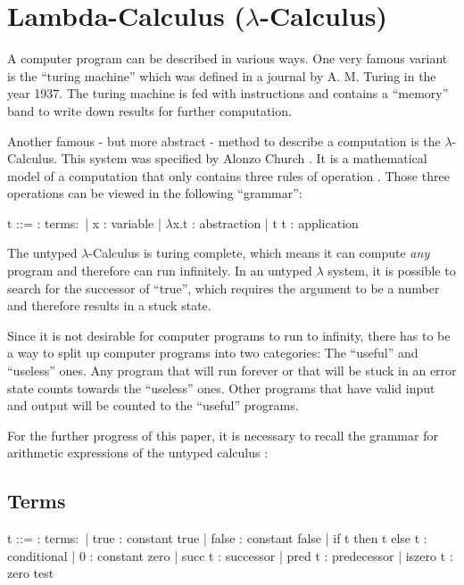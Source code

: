 \section{Lambda-Calculus ($\lambda$-Calculus)}

A computer program can be described in various
ways. One very famous variant is the ``turing machine''
which was defined in a journal \cite{aturingMachine} by
A. M. Turing in the year 1937. The turing machine
is fed with instructions and contains a ``memory'' band
to write down results for further computation.

Another famous - but more abstract - method to describe
a computation is the $\lambda$-Calculus. This system was
specified by Alonzo Church \cite{churchLambda}. It is a mathematical
model of a computation that only contains three rules
of operation \cite{pierce2002ProgLang}.
Those three operations can be viewed in the following ``grammar'':

\begin{bnfgrammar}
    t ::= : terms$\colon$
    | x : variable
    | $\lambda$x.t : abstraction
    | t t : application
\end{bnfgrammar}

The untyped $\lambda$-Calculus is turing complete,
which means it can compute \textit{any} program and
therefore can run infinitely.
In an untyped $\lambda$ system, it is possible to search
for the successor of ``true'', which
requires the argument to be a number and therefore
results in a stuck state.

Since it is not desirable for computer programs to run to infinity,
there has to be a way to split up computer programs into two categories:
The ``useful'' and ``useless'' ones. Any program that will run forever
or that will be stuck in an error state counts towards the ``useless'' ones.
Other programs that have valid input and output will be counted to the ``useful''
programs.


For the further progress of this paper, it is necessary to recall
the grammar for arithmetic expressions of the untyped calculus \cite{pierce2002ProgLang}:

\subsection{Terms}

\begin{bnfgrammar}
    t ::= : terms$\colon$
    | true : constant true
    | false : constant false
    | if t then t else t : conditional
    | 0 : constant zero
    | succ t : successor
    | pred t : predecessor
    | iszero t : zero test
\end{bnfgrammar}

